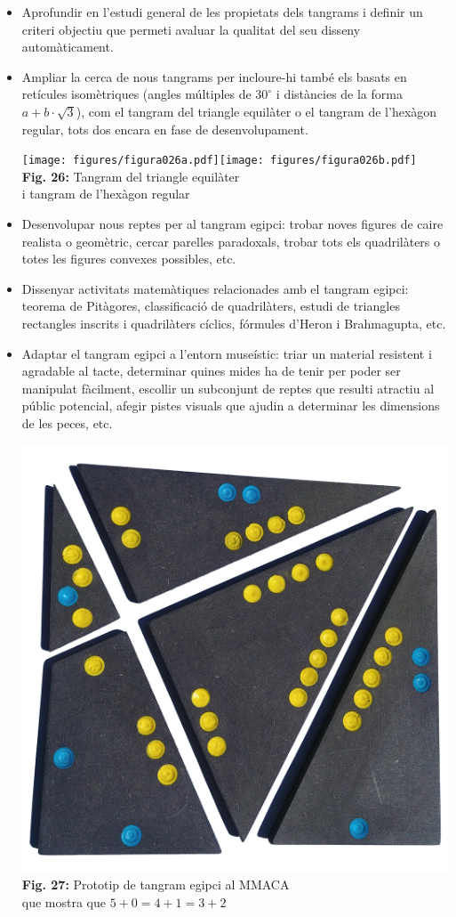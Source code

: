 \documentclass[a4paper,11pt]{article}
\begin{document}
\begin{multicols}{2}
            \begin{itemize}
                \item Aprofundir en l'estudi general de les propietats dels tangrams i definir un criteri objectiu que permeti avaluar la qualitat del seu disseny automàticament.
                \item Ampliar la cerca de nous tangrams per incloure-hi també els basats en retícules isomètriques (angles múltiples de $30^\circ$ i distàncies de la forma $a + b \cdot \sqrt{3}$), com el tangram del triangle equilàter o el tangram de l'hexàgon regular, tots dos encara en fase de desenvolupament.
                    \begin{center}
                        \texttt{[image: figures/figura026a.pdf]}\qquad\texttt{[image: figures/figura026b.pdf]} \\
                        \footnotesize{\textbf{Fig. 26:} Tangram del triangle equilàter\\ i tangram de l'hexàgon regular}
                    \end{center}
                \item Desenvolupar nous reptes per al tangram egipci: trobar noves figures de caire realista o geomètric, cercar parelles paradoxals, trobar tots els quadrilàters o totes les figures convexes possibles, etc.
                \item Dissenyar activitats matemàtiques relacionades amb el tangram egipci: teorema de Pitàgores, classificació de quadrilàters, estudi de triangles rectangles inscrits i quadrilàters cíclics, fórmules d'Heron i Brahmagupta, etc.
                \item Adaptar el tangram egipci a l'entorn museístic: triar un material resistent i agradable al tacte, determinar quines mides ha de tenir per poder ser manipulat fàcilment, escollir un subconjunt de reptes que resulti atractiu al públic potencial, afegir pistes visuals que ajudin a determinar les dimensions de les peces, etc.
                    \begin{center}
                        \includegraphics[height=25ex]{figures/figura027.jpg} \\
                        \footnotesize{\textbf{Fig. 27:} Prototip de tangram egipci al MMACA\\ que mostra que $5+0 = 4+1 = 3+2$}
                    \end{center}
            \end{itemize}


\end{multicols}
\end{document}
